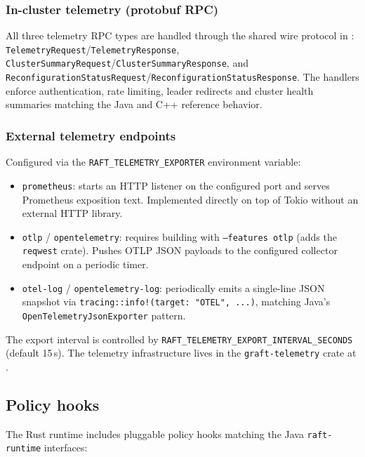 \subsubsection{In-cluster telemetry (protobuf RPC)}

All three telemetry RPC types are handled through the shared wire protocol in
: \texttt{TelemetryRequest}/\texttt{TelemetryResponse},
\texttt{ClusterSummaryRequest}/\texttt{ClusterSummaryResponse}, and
\texttt{ReconfigurationStatusRequest}/\texttt{ReconfigurationStatusResponse}.
The handlers enforce authentication, rate limiting, leader redirects and cluster
health summaries matching the Java and C++ reference behavior.

\subsubsection{External telemetry endpoints}

Configured via the \texttt{RAFT\_TELEMETRY\_EXPORTER} environment variable:

\begin{itemize}
\item \texttt{prometheus}: starts an HTTP listener on the configured port and
  serves Prometheus exposition text. Implemented directly on top of Tokio
  without an external HTTP library.

\item \texttt{otlp} / \texttt{opentelemetry}: requires building with
  \texttt{---features otlp} (adds the \texttt{reqwest} crate). Pushes OTLP
  JSON payloads to the configured collector endpoint on a periodic timer.

\item \texttt{otel-log} / \texttt{opentelemetry-log}: periodically emits a
  single-line JSON snapshot via \texttt{tracing::info!(target: "OTEL", ...)},
  matching Java's \texttt{OpenTelemetryJsonExporter} pattern.
\end{itemize}

The export interval is controlled by
\texttt{RAFT\_TELEMETRY\_EXPORT\_INTERVAL\_SECONDS} (default 15\,s). The
telemetry infrastructure lives in the \texttt{graft-telemetry} crate at
.

\subsection{Policy hooks}

The Rust runtime includes pluggable policy hooks matching the Java
\texttt{raft-runtime} interfaces:

